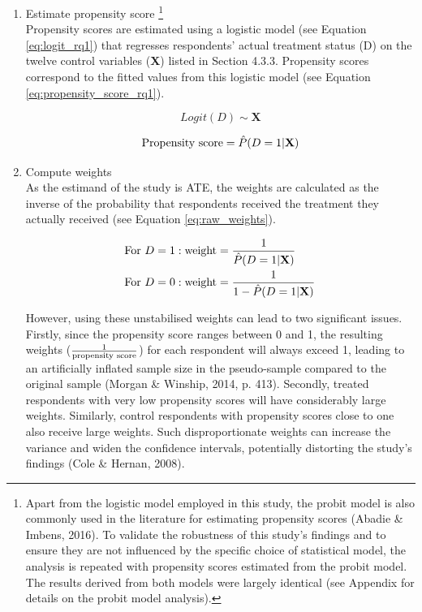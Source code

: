 \begin{enumerate}[wide=0pt, leftmargin=*, labelwidth=0pt, labelindent=\parindent, itemindent=0pt]
    \item Estimate propensity score \footnote{Apart from the logistic model employed in this study, the probit model is also commonly used in the literature for estimating propensity scores (Abadie \& Imbens, 2016). To validate the robustness of this study's findings and to ensure they are not influenced by the specific choice of statistical model, the analysis is repeated with propensity scores estimated from the probit model. The results derived from both models were largely identical (see Appendix for details on the probit model analysis).} \\
    Propensity scores are estimated using a logistic model (see Equation \ref{eq:logit_rq1}) that regresses respondents' actual treatment status (D) on the twelve control variables (\textbf{X}) listed in Section 4.3.3. Propensity scores correspond to the fitted values from this logistic model (see Equation \ref{eq:propensity_score_rq1}).

    \begin{equation}
        \label{eq:logit_rq1}
        Logit(D) \sim \textbf{X}
    \end{equation}

    \begin{equation}
        \label{eq:propensity_score_rq1}
        \textnormal{Propensity score} = \hat{P}(D = 1 | \textbf{X})
    \end{equation}

    \item Compute weights \\
    As the estimand of the study is ATE, the weights are calculated as the inverse of the probability that respondents received the treatment they actually received (see Equation \ref{eq:raw_weights}).

    \begin{equation}
        \label{eq:raw_weights}
        \begin{aligned}
            \textnormal{For } D &= 1: \textnormal{weight} = \frac{1}{\hat{P}(D = 1 | \textbf{X})} \\
            \textnormal{For } D &= 0: \textnormal{weight} = \frac{1}{1 - \hat{P}(D = 1 | \textbf{X})}
        \end{aligned}
    \end{equation}

    However, using these unstabilised weights can lead to two significant issues. Firstly, since the propensity score ranges between 0 and 1, the resulting weights ($\frac{1}{\textnormal{propensity score}}$) for each respondent will always exceed 1, leading to an artificially inflated sample size in the pseudo-sample compared to the original sample (Morgan \& Winship, 2014, p. 413). Secondly, treated respondents with very low propensity scores will have considerably large weights. Similarly, control respondents with propensity scores close to one also receive large weights. Such disproportionate weights can increase the variance and widen the confidence intervals, potentially distorting the study's findings (Cole \& Hernan, 2008).


\end{enumerate}
